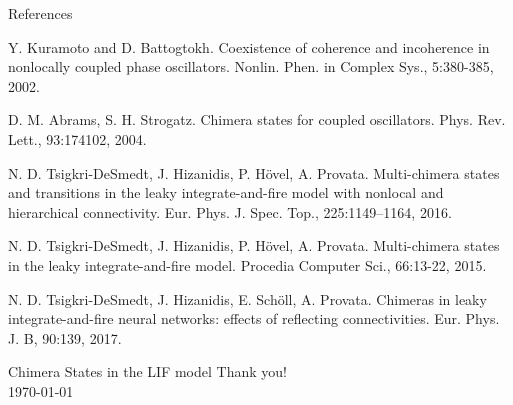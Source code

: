 \documentclass{beamer}
\begin{document}
\begin{frame}{References}
\begin{small}
\begin{thebibliography}{30}

Y. Kuramoto and D. Battogtokh. Coexistence of coherence and incoherence in nonlocally coupled phase oscillators. Nonlin. Phen. in Complex Sys., 5:380-385, 2002.

D. M. Abrams, S. H. Strogatz. Chimera states for coupled oscillators. Phys. Rev. Lett., 93:174102, 2004.

N. D. Tsigkri-DeSmedt, J. Hizanidis, P. H{\"o}vel, A. Provata. Multi-chimera states and transitions in the leaky integrate-and-fire model with nonlocal and hierarchical connectivity. Eur. Phys. J. Spec. Top., 225:1149–1164, 2016.

N. D. Tsigkri-DeSmedt, J. Hizanidis, P. H{\"o}vel, A. Provata. Multi-chimera states in the leaky integrate-and-fire model. Procedia Computer Sci., 66:13-22, 2015.

N. D. Tsigkri-DeSmedt, J. Hizanidis, E. Sch{\"o}ll, A. Provata. Chimeras in leaky integrate-and-fire neural networks: effects of reflecting connectivities. Eur. Phys. J. B, 90:139, 2017.

\end{thebibliography}
\end{small}
\end{frame}

\begin{frame}{Chimera States in the LIF model}
  \centering
  \huge{Thank you!\\}
  \vspace{1cm}
\Large{\today}
  
\end{frame}
\end{document}

